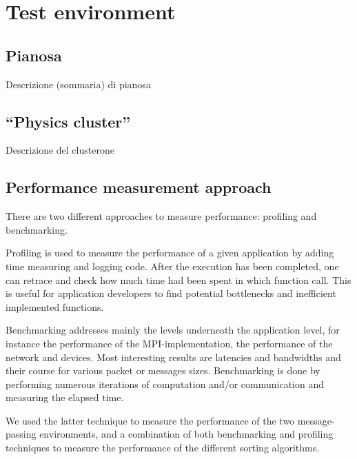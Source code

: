 \section{Test environment}

\subsection{Pianosa}
Descrizione (sommaria) di pianosa

\subsection{``Physics cluster''}
Descrizione del clusterone

\subsection{Performance measurement approach}
\label{test-env}
There are two different approaches to measure performance: profiling and benchmarking.

Profiling is used to measure the performance of a given application by adding time measuring and logging code. After the execution has been completed, one can retrace and check how much time had been spent in which function call. This is useful for application developers to find potential bottlenecks and inefficient implemented functions.

Benchmarking addresses mainly the levels underneath the application level, for instance the performance
of the MPI-implementation, the performance of the network and devices. Most interesting results are latencies and bandwidths and their course for various packet or messages sizes. Benchmarking is done by performing numerous iterations of computation and/or communication and measuring the elapsed time.

We used the latter technique to measure the performance of the two message-passing environments, and a combination of both benchmarking and profiling techniques to measure the performance of the different sorting algorithms.

